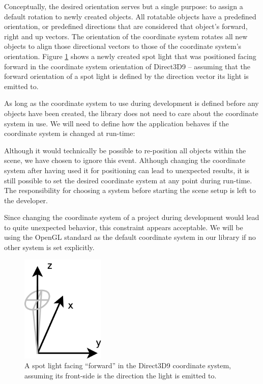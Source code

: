 	Conceptually, the desired orientation serves but a single purpose: to assign a default rotation to newly created objects. All rotatable objects have a predefined orientation, or predefined directions that are considered that object's forward, right and up vectors. The orientation of the coordinate system rotates all new objects to align those directional vectors to those of the coordinate system's orientation. Figure \ref{fig:RotatedSpotLight} shows a newly created spot light that was positioned facing forward in the coordinate system orientation of Direct3D9 -- assuming that the forward orientation of a spot light is defined by the direction vector its light is emitted to.

	As long as the coordinate system to use during development is defined before any objects have been created, the library does not need to care about the coordinate system in use. We will need to define how the application behaves if the coordinate system is changed at run-time:

	Although it would technically be possible to re-position all objects within the scene, we have chosen to ignore this event. Although changing the coordinate system after having used it for positioning can lead to unexpected results, it is still possible to set the desired coordinate system at any point during run-time. The responsibility for choosing a system before starting the scene setup is left to the developer.
	
	Since changing the coordinate system of a project during development would lead to quite unexpected behavior, this constraint appears acceptable. We will be using the OpenGL standard as the default coordinate system in our library if no other system is set explicitly.

	\begin{figure}[htbp]
		\centering
		\includegraphics[width=4cm]{images/rotatedspotlight.png}
		\caption{A spot light facing ``forward'' in the Direct3D9 coordinate system, assuming its front-side is the direction the light is emitted to.}
		\label{fig:RotatedSpotLight}
	\end{figure}

